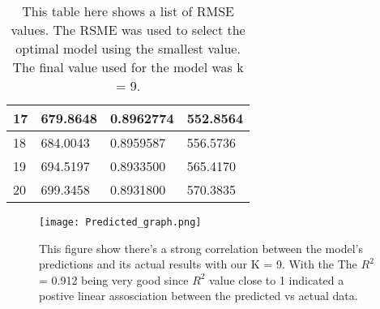 \documentclass{article}\usepackage[]{graphicx}\usepackage[]{color}
\begin{document}
\begin{table}[h]
\begin{tabular}{|llll|}
\multicolumn{1}{|l|}{17}                                                                                                                                                                                                                   & \multicolumn{1}{l|}{679.8648}      & \multicolumn{1}{l|}{0.8962774}         & 552.8564     \\ \hline
\multicolumn{1}{|l|}{18}                                                                                                                                                                                                                   & \multicolumn{1}{l|}{684.0043}      & \multicolumn{1}{l|}{0.8959587}         & 556.5736     \\ \hline
\multicolumn{1}{|l|}{19}                                                                                                                                                                                                                   & \multicolumn{1}{l|}{694.5197}      & \multicolumn{1}{l|}{0.8933500}         & 565.4170     \\ \hline
\multicolumn{1}{|l|}{20}                                                                                                                                                                                                                   & \multicolumn{1}{l|}{699.3458}      & \multicolumn{1}{l|}{0.8931800}         & 570.3835     \\ \hline
\end{tabular}
\caption{This table here shows a list of RMSE values. The RSME was used to select the optimal model using the smallest value. The final value used for the model was k = 9.}
\end{table}


\begin{figure}[h]
\texttt{[image: Predicted\_graph.png]}
\caption{This figure show there’s a strong correlation between the model’s predictions and its actual results with our K = 9. With the The $R^2$ = 0.912 being very good since $R^2$ value close to 1 indicated a postive linear assosciation between the predicted vs actual data.}
\end{figure}
\end{document}
